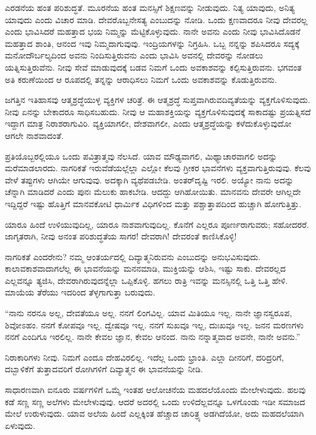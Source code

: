 ಎರಡನೆಯ ಹಂತ ಪರಿಶುದ್ಧತೆ. ಮೂರನೆಯ ಹಂತ ಮನಸ್ಸಿಗೆ ಶಿಕ್ಷಣವನ್ನು ನೀಡುವುದು. ನಿತ್ಯ ಯಾವುದು, ಅನಿತ್ಯ ಯಾವುದು ಎಂದು ವಿಚಾರ ಮಾಡಿ. ದೇವರೊಬ್ಬನೇ\break ಸತ್ಯ ಎಂಬುದನ್ನು ನೋಡಿ. ಒಂದು ಕ್ಷಣವಾದರೂ ನೀವು ದೇವರಲ್ಲ ಎಂದು ಭಾವಿಸಿದರೆ ಮಹತ್ತಾದ ಭಯ ನಿಮ್ಮನ್ನು ಮೆಟ್ಟಿಕೊಳ್ಳುವುದು. ನಾನೇ ಅವನು ಎಂದು ನೀವು ಭಾವಿಸಿದೊಡನೆ ಮಹತ್ತಾದ ಶಾಂತಿ, ಆನಂದ ಇವು ನಿಮ್ಮದಾಗುವುವು. ಇಂದ್ರಿಯಗಳನ್ನು ನಿಗ್ರಹಿಸಿ. ಒಬ್ಬ ನನ್ನನ್ನು ಶಪಿಸಿದರೂ ಸದ್ಯಕ್ಕೆ ಮನೋದೌರ್ಬಲ್ಯದಿಂದ ಅವನು ನಿಂದಿಸುತ್ತಿರುವನು ಎಂದು ಭಾವಿಸಿ ಅವನಲ್ಲಿ ದೇವರನ್ನು ನೋಡಲು ಯತ್ನಿಸುತ್ತಿರುವೆನು. ನೀವು ಸೇವೆ ಮಾಡುವುದಕ್ಕೆ ಬಡವ ನಿಮಗೆ ಒಂದು ಅವಕಾಶವನ್ನು ಕಲ್ಪಿಸುತ್ತಿರುವನು. ಭಗವಂತ ಅತಿ ಕರುಣೆಯಿಂದ ಆ ರೂಪದಲ್ಲಿ ತನ್ನನ್ನು ಆರಾಧಿಸಲು ನಿಮಗೆ ಒಂದು ಅವಕಾಶವನ್ನು ಕೊಡುತ್ತಿರುವನು.

ಜಗತ್ತಿನ ಇತಿಹಾಸವು ಆತ್ಮಶ್ರದ್ಧೆಯುಳ್ಳ ವ್ಯಕ್ತಿಗಳ ಚರಿತ್ರೆ. ಈ ಆತ್ಮಶ್ರದ್ಧೆ ಸುಪ್ತವಾಗಿರುವ\break ದಿವ್ಯತೆಯನ್ನು ವ್ಯಕ್ತಗೊಳಿಸುವುದು. ನೀವು ಏನನ್ನು ಬೇಕಾದರೂ ಸಾಧಿಸಬಹುದು. ನೀವು ಆ ಮಹಾಶಕ್ತಿಯನ್ನು ವ್ಯಕ್ತಗೊಳಿಸುವುದಕ್ಕೆ ಸಾಕಾದಷ್ಟು ಪ್ರಯತ್ನಿಸದೆ ಇದ್ದಾಗ ಮಾತ್ರ ನಿರಾಶರಾಗುವಿರಿ. ವ್ಯಕ್ತಿಯಾಗಲೀ, ದೇಶವಾಗಲೀ, ಎಂದು ಆತ್ಮಶ್ರದ್ಧೆಯನ್ನು ಕಳೆದುಕೊಳ್ಳುವುದೋ ಆಗಲೇ ನಾಶವಾದಂತೆ.

ಪ್ರತಿಯೊಬ್ಬರಲ್ಲಿಯೂ ಒಂದು ಪವಿತ್ರಾತ್ಮವು ನೆಲಸಿದೆ. ಯಾವ ಮೌಢ್ಯವಾಗಲಿ, ಮಿಥ್ಯಾಚಾರವಾಗಲಿ ಅದನ್ನು ಮರೆಮಾಡಲಾರದು. ನಾಗರಿಕತೆ ಇರುವೆಡೆಯಲ್ಲೆಲ್ಲಾ ಎಲ್ಲೋ ಕೆಲವು ಗ್ರೀಕರ ಭಾವನೆಗಳು ವ್ಯಕ್ತವಾಗುತ್ತಿರುವುವು. ಕೆಲವು ವೇಳೆ ತಪ್ಪುಗಳು ಆಗಿಯೇ ಆಗುವುವು. ಅದಕ್ಕಾಗಿ ವ್ಯಥೆಪಡಬೇಡಿ. ಅಂತರ್​ದೃಷ್ಟಿ ಇರಲಿ. ಅಯ್ಯೋ ನಾನು ಅದನ್ನು ಚೆನ್ನಾಗಿ ಮಾಡಿದರೆ ಎಂದು ಪುನಃ ಮೆಲುಕು ಹಾಕಬೇಡಿ. ಆದದ್ದು ಆಗಿಹೋಯಿತು. ಮಾನವನು ದೇವರೇ ಆಗಿಲ್ಲದೇ ಇದ್ದಿದ್ದರೆ ಇಷ್ಟು ಹೊತ್ತಿಗೆ ಮಾನವಕೋಟಿ ಧಾರ್ಮಿಕ ವಿಧಿಗಳಿಂದ ಮತ್ತು ಪಶ್ಚಾತ್ತಾಪದಿಂದ ಹುಚ್ಚಾಗಿ ಹೋಗುತ್ತಿತ್ತು.

ಯಾರೂ ಹಿಂದೆ ಉಳಿಯುವುದಿಲ್ಲ, ಯಾರೂ ನಾಶವಾಗುವುದಿಲ್ಲ. ಕೊನೆಗೆ ಎಲ್ಲರೂ ಪೂರ್ಣರಾಗುವರು; ಸಹೋದರರೆ. ಜಾಗೃತರಾಗಿ, ನೀವು ಅನಂತ ಪರಿಶುದ್ಧತೆಯ ಸಾಗರ! ದೇವರಾಗಿ! ದೇವರಂತೆ ಕಾಣಿಸಿಕೊಳ್ಳಿ!

ನಾಗರಿಕತೆ ಎಂದರೇನು? ನಮ್ಮ ಆಂತರ್ಯದಲ್ಲಿ ದಿವ್ಯಾತ್ಮನಿರುವನು ಎಂಬುದನ್ನು ಅನುಭವಿಸುವುದು. ಕಾಲಾವಕಾಶವಾದಾಗಲೆಲ್ಲ ಈ ಭಾವನೆಯನ್ನು ಮನನಮಾಡಿ, ಮುಕ್ತಿಯನ್ನು ಆಶಿಸಿ, ಇಷ್ಟು ಸಾಕು. ದೇವರಲ್ಲದ ಎಲ್ಲವನ್ನೂ ತ್ಯಜಿಸಿ, ದೇವರಾಗಿರುವುದನ್ನೆಲ್ಲಾ ಒಪ್ಪಿಕೊಳ್ಳಿ. ಹಗಲು ರಾತ್ರಿ ಇವನ್ನು ಮನಸ್ಸಿನಲ್ಲಿ ಒತ್ತಿ ಒತ್ತಿ ಹೇಳಿ. ಮಾಯೆಯ ತೆರೆಯು ಇದರಿಂದ ತೆಳ್ಳಗಾಗುತ್ತಾ ಬರುವುದು.

“ನಾನು ನರನೂ ಅಲ್ಲ, ದೇವತೆಯೂ ಅಲ್ಲ. ನನಗೆ ಲಿಂಗವಿಲ್ಲ. ಯಾವ ಮಿತಿಯೂ ಇಲ್ಲ. ನಾನೇ ಜ್ಞಾನಸ್ವರೂಪ, ಶಿವೋಽಹಂ. ನನಗೆ ಕೋಪವೂ ಇಲ್ಲ. ದ್ವೇಷವೂ ಇಲ್ಲ. ನನಗೆ ಸುಖವೂ ಇಲ್ಲ, ದುಃಖವೂ ಇಲ್ಲ. ಜನನ ಮರಣಗಳು ನನಗೆ ಎಂದಿಗೂ ಇರಲಿಲ್ಲ. ನಾನೇ ಕೇವಲ ಜ್ಞಾನ, ಕೇವಲ ಆನಂದ. ನಾನು ನನ್ನಾತ್ಮವಾದ ಅವನೇ, ನಾನೇ ಅವನು.”

ನಿರಾಕಾರಿಗಳು ನೀವು. ನಿಮಗೆ ಎಂದೂ ದೇಹವಿರಲಿಲ್ಲ. ಇದೆಲ್ಲ ಒಂದು ಭ್ರಾಂತಿ. ಎಲ್ಲಾ ದೀನರಿಗೆ, ದರಿದ್ರರಿಗೆ, ದಬ್ಬಾಳಿಕೆಗೆ ತುತ್ತಾದವರಿಗೆ ರೋಗಿಗಳಿಗೆ ದಿವ್ಯಾತ್ಮನ ಈ ಭಾವನೆಯನ್ನು ನೀಡಿ.

ಸಾಧಾರಣವಾಗಿ ಐನೂರು ವರ್ಷಗಳಿಗೆ ಒಮ್ಮೆ ಇಂತಹ ಆಲೋಚನೆಯ ಮಹದಲೆಯೊಂದು ಮೇಲೇಳುವುದು. ಹಲವು ಕಡೆ ಸಣ್ಣ ಸಣ್ಣ ಅಲೆಗಳು ಮೇಲೇಳುವುವು. ಆದರೆ ಅದರಲ್ಲಿ ಒಂದು ಉಳಿದೆಲ್ಲವನ್ನೂ ಒಳಗೊಂಡು ಇಡೀ ಸಮಾಜದ ಮೇಲೆ ಉರುಳುವುದು. ಯಾವ ಅಲೆಯ ಹಿಂದೆ ಎಲ್ಲಕ್ಕಿಂತ ಹೆಚ್ಚಾದ ಚಾರಿತ್ರ್ಯ ಅಡಗಿದೆಯೋ, ಅದು ಮಹದಲೆಯಾಗಿ ಏಳುವುದು.

